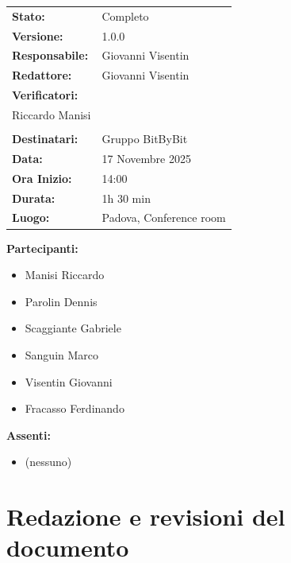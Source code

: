 \documentclass[a4paper,12pt]{article}
\begin{document}
\begin{tcolorbox}
\begin{tabularx}{\textwidth}{@{}l X@{}}
\textbf{Stato:} & Completo\\
\textbf{Versione:} & 1.0.0\\
\textbf{Responsabile:} & Giovanni Visentin\\
\textbf{Redattore:} & Giovanni Visentin \\
\textbf{Verificatori:} & 
    \begin{tabular}[t]{@{}l@{}}
            Dennis Parolin \\
            Riccardo Manisi\\
    \end{tabular}\\
\textbf{Destinatari:} & Gruppo BitByBit\\
\textbf{Data:} & 17 Novembre 2025 \\
\textbf{Ora Inizio:} & 14:00 \\
\textbf{Durata:} & 1h 30 min \\
\textbf{Luogo:} & Padova, Conference room \\
\end{tabularx}
\end{tcolorbox}

\vspace{0.4cm}
\textbf{Partecipanti:}
\begin{itemize}
    \item Manisi Riccardo
    \item Parolin Dennis
    \item Scaggiante Gabriele
    \item Sanguin Marco
    \item Visentin Giovanni
    \item Fracasso Ferdinando
\end{itemize}

\textbf{Assenti:}
\begin{itemize}
    \item (nessuno)
\end{itemize}

\clearpage

\vspace{0.5cm}

\vspace{0.8cm}

\clearpage
\section*{Redazione e revisioni del documento}
\end{document}
